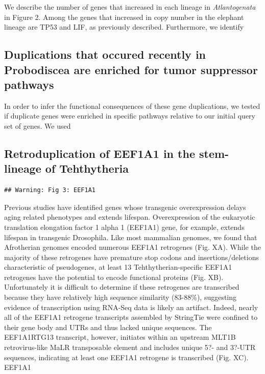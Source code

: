 \documentclass[10pt,letterpaper]{article}
\begin{document}
We describe the number of genes that increased in each lineage in
\emph{Atlantogenata} in Figure 2. Among the genes that increased in copy
number in the elephant lineage are TP53 and LIF, as previously
described. Furthermore, we identify

\hypertarget{duplications-that-occured-recently-in-probodiscea-are-enriched-for-tumor-suppressor-pathways}{%
\subsection{Duplications that occured recently in Probodiscea are
enriched for tumor suppressor
pathways}\label{duplications-that-occured-recently-in-probodiscea-are-enriched-for-tumor-suppressor-pathways}}

In order to infer the functional consequences of these gene
duplications, we tested if duplicate genes were enriched in specific
pathways relative to our initial query set of genes. We used

\hypertarget{retroduplication-of-eef1a1-in-the-stem-lineage-of-tehthytheria}{%
\subsection{Retroduplication of EEF1A1 in the stem-lineage of
Tehthytheria}\label{retroduplication-of-eef1a1-in-the-stem-lineage-of-tehthytheria}}

\begin{verbatim}
## Warning: Fig 3: EEF1A1
\end{verbatim}

Previous studies have identified genes whose transgenic overexpression
delays aging related phenotypes and extends lifespan. Overexpression of
the eukaryotic translation elongation factor 1 alpha 1 (EEF1A1) gene,
for example, extends lifespan in transgenic Drosophila. Like most
mammalian genomes, we found that Afrotherian genomes encoded numerous
EEF1A1 retrogenes (Fig. XA). While the majority of these retrogenes have
premature stop codons and insertions/deletions characteristic of
pseudogenes, at least 13 Tehthytherian-specific EEF1A1 retrogenes have
the potential to encode functional proteins (Fig. XB). Unfortunately it
is difficult to determine if these retrogenes are transcribed because
they have relatively high sequence similarity (83-88\%), suggesting
evidence of transcription using RNA-Seq data is likely an artifact.
Indeed, nearly all of the EEF1A1 retrogene transcripts assembled by
StringTie were confined to their gene body and UTRs and thus lacked
unique sequences. The EEF1A1RTG13 transcript, however, initiates within
an upstream MLT1B retrovirus-like MaLR transposable element and includes
unique 5?- and 3?-UTR sequences, indicating at least one EEF1A1
retrogene is transcribed (Fig. XC). EEF1A1
\end{document}
